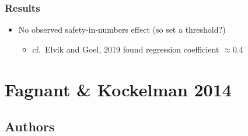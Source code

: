 \documentclass{beamer}
\begin{document}
\begin{frame}
  \frametitle{Results}
  \begin{itemize}
  \item No observed safety-in-numbers effect (so set a threshold?)
    \begin{itemize}
    \item cf.~Elvik and Goel, 2019 found regression coefficient $\approx 0.4$
    \end{itemize}
  \end{itemize}
\end{frame}



\section{Fagnant \& Kockelman 2014}

\subsection{Authors}
\end{document}
